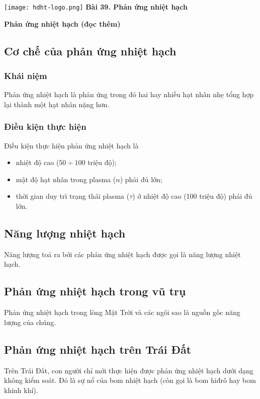 \newcommand{\chapter}[2][]{
	\newcommand{\chapname}{#2}
	\begin{flushleft}
		\begin{minipage}[t]{\linewidth}
			\texttt{[image: hdht-logo.png]}
			\hspace{0pt}	
			\sffamily\bfseries\large Bài  39. Phản ứng nhiệt hạch
			\begin{flushleft}
				\huge\bfseries #1
			\end{flushleft}
		\end{minipage}
	\end{flushleft}
	\vspace{1cm}
	\normalfont\normalsize
}
\chapter[Phản ứng nhiệt hạch (đọc thêm)]{Phản ứng nhiệt hạch (đọc thêm)}

\subsection{Cơ chế của phản ứng nhiệt hạch}
	\subsubsection{Khái niệm}
	Phản ứng nhiệt hạch là phản ứng trong đó hai hay nhiều hạt nhân nhẹ tổng hợp lại thành một hạt nhân nặng hơn.
	\subsubsection{Điều kiện thực hiện}
	Điều kiện thực hiện phản ứng nhiệt hạch là
	\begin{itemize}
		\item nhiệt độ cao ($50\div100$ triệu độ);
		\item mật độ hạt nhân trong plasma ($n$) phải đủ lớn;
		\item thời gian duy trì trạng thái plasma ($\tau$) ở nhiệt độ cao (100 triệu độ) phải đủ lớn.
	\end{itemize}
\subsection{Năng lượng nhiệt hạch}
	Năng lượng toả ra bởi các phản ứng nhiệt hạch được gọi là năng lượng
	nhiệt hạch.
\subsection{Phản ứng nhiệt hạch trong vũ trụ}
	Phản ứng nhiệt hạch trong lòng Mặt Trời và các ngôi sao là nguồn gốc năng lượng của chúng.
\subsection{Phản ứng nhiệt hạch trên Trái Đất}
	Trên Trái Đất, con người chỉ mới thực hiện được phản ứng nhiệt hạch dưới dạng không kiểm soát. Đó là sự nổ của bom nhiệt hạch (còn gọi là bom hiđrô hay bom khinh khí).